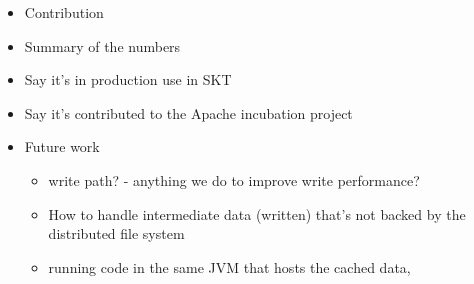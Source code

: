 \documentclass[twocolumn,10pt]{article}
\begin{document}
\begin{itemize}
\item Contribution
\item Summary of the numbers
\item Say it's in production use in SKT
\item Say it's contributed to the Apache incubation project
\item Future work
\begin{itemize}
\item write path? - anything we do to improve write performance?
\item How to handle intermediate data (written) that's not backed by the distributed file system
\item running code in the same JVM that hosts the cached data,
\end{itemize}

\end{itemize}



\end{document}
